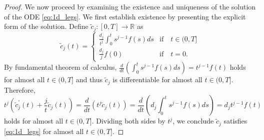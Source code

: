 \documentclass{article}
\theoremstyle{definition}
\newcommand{\pr}[1]{ \left( #1 \right) }
\newcommand{\derivative}[1]{#1^{\prime}}
\begin{document}
\begin{proof}
    We now proceed by examining the existence and uniqueness of the solution 
    of the ODE \eqref{eq:1d_legs}. 
    We first establish existence by presenting the explicit form of the solution.  
    Define $\tilde{c}_j\colon[0,T]\to\mathbb{R}$ as
    \begin{equation}    \label{eq:closed_form_solution}
        \tilde{c}_j(t) = \begin{cases}
            \frac{d_j}{t^j} \int^t_0 s^{j-1} f(s) ds  & \text{if} \quad t \in (0,T] \\
            \frac{d_j}{j} f(0)  & \text{if} \quad t = 0.
        \end{cases}
    \end{equation}
    By fundamental theorem of calculus, $\frac{d}{dt} \pr{ \int^t_0 s^{j-1} f(s) ds } = t^{j-1} f(t)$ holds for almost all $t\in(0,T]$ and thus $\tilde{c}_j$ is differentiable for almost all $t\in(0,T]$. 
    Therefore,
    \[
        t^j \pr{ \derivative{\tilde{c}}_j(t) + \frac{j}{t} \tilde{c}_j(t) } 
        = \frac{d}{dt} (t^j\tilde{c}_j(t)) 
        = \frac{d}{dt} \pr{ d_j \int^t_0 s^{j-1} f(s) ds }
        = d_j t^{j-1} f(t) 
    \]
    holds for almost all $t\in(0,T]$. 
    Dividing both sides by $t^j$, we conclude $\tilde{c}_j$ satisfies \eqref{eq:1d_legs} for almost all $t\in(0,T]$.
    

\end{proof}
\end{document}
